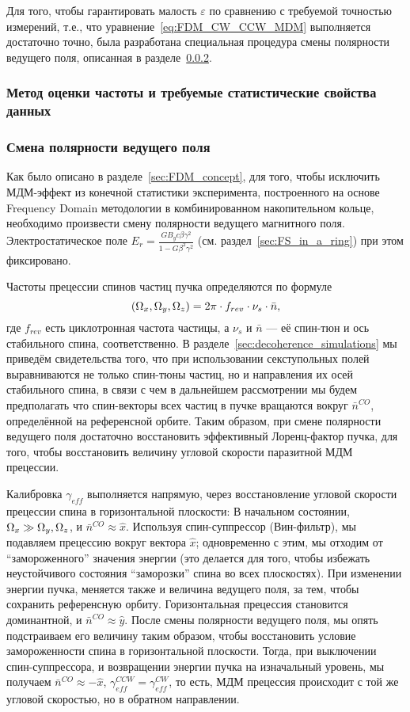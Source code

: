 Для того, чтобы гарантировать малость $\varepsilon$ по сравнению с требуемой точностью измерений, т.е., что уравнение~\eqref{eq:FDM_CW_CCW_MDM} выполняется достаточно точно, была разработана специальная процедура смены полярности ведущего поля, описанная в разделе~\ref{sec:field_flipping-theory}.

\subsubsection{Метод оценки частоты и требуемые статистические свойства данных}

\subsubsection{Смена полярности ведущего поля}\label{sec:field_flipping-theory}
Как было описано в разделе~\ref{sec:FDM_concept}, для того, чтобы исключить МДМ-эффект из конечной статистики эксперимента, построенного на основе Frequency Domain методологии в комбинированном накопительном кольце, необходимо произвести смену полярности ведущего магнитного поля. Электростатическое поле $E_r = \frac{GB_yc\beta\gamma^2}{1-G\beta^2\gamma^2}$ (см. раздел~\ref{sec:FS_in_a_ring}) при этом фиксировано.

Частоты прецессии спинов частиц пучка определяются по формуле~\cite[стр.~4]{COSY:SpinTuneMapping}
\[
(\Omega_x, \Omega_y, \Omega_z) = 2\pi\cdot f_{rev} \cdot \nu_s \cdot \bar n,
\]
где $f_{rev}$ есть циклотронная частота частицы, а $\nu_s$ и $\bar n$ --- её спин-тюн и ось стабильного спина, соответственно. В разделе~\ref{sec:decoherence_simulations} мы приведём свидетельства того, что при использовании секступольных полей выравниваются не только спин-тюны частиц, но и направления их осей стабильного спина, в связи с чем в дальнейшем рассмотрении мы будем предполагать что спин-векторы всех частиц в пучке вращаются вокруг $\bar n^{CO}$, определённой на референсной орбите. Таким образом, при смене полярности ведущего поля достаточно восстановить эффективный Лоренц-фактор пучка, для того, чтобы восстановить величину угловой скорости паразитной МДМ прецессии.

Калибровка $\gamma_{eff}$ выполняется напрямую, через восстановление угловой скорости прецессии спина в горизонтальной плоскости:
В начальном состоянии, $\Omega_x\gg \Omega_y, \Omega_z$, и $\bar n^{CO}\approx \hat x$. Используя спин-суппрессор (Вин-фильтр), мы подавляем прецессию вокруг вектора $\hat x$; одновременно с этим, мы отходим от ``замороженного'' значения энергии (это делается для того, чтобы избежать неустойчивого состояния ``заморозки'' спина во всех плоскостях). При изменении энергии пучка, меняется также и величина ведущего поля, за тем, чтобы сохранить референсную орбиту. Горизонтальная прецессия становится доминантной, и $\bar n^{CO} \approx \hat y$. После смены полярности ведущего поля, мы опять подстраиваем его величину таким образом, чтобы восстановить условие замороженности спина в горизонтальной плоскости. Тогда, при выключении спин-суппрессора, и возвращении энергии пучка на изначальный уровень, мы получаем $\bar n^{CO} \approx -\hat x$, $\gamma_{eff}^{CCW} = \gamma_{eff}^{CW}$, то есть, МДМ прецессия происходит с той же угловой скоростью, но в обратном направлении. 

